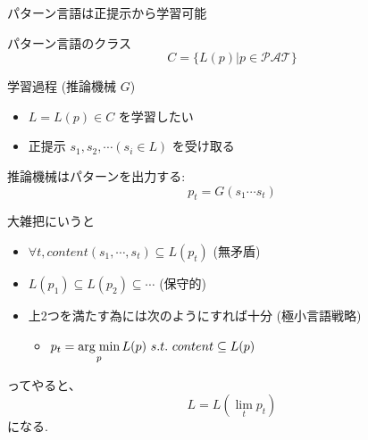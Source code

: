 \documentclass[professionalfont, 12pt, dvipdfmx, default, cjk]{beamer}
\begin{document}
\begin{frame}{パターン言語は正提示から学習可能}

パターン言語のクラス \[C = \{ L(p) | p \in \mathcal{PAT} \}\]

\end{frame}

\begin{frame}{学習過程 (推論機械 \(G\))}

\begin{itemize}
\itemsep1pt\parskip0pt
\item
  \(L = L(p) \in C\) を学習したい
\item
  正提示 \(s_1, s_2, \cdots (s_i \in L)\) を受け取る
\end{itemize}

推論機械はパターンを出力する: \[p_t = G(s_1 \cdots s_t)\]

\pause
大雑把にいうと

\begin{itemize}
\itemsep1pt\parskip0pt
\item
  \(\forall t, content(s_1, \cdots, s_t) \subseteq L(p_t)\) (無矛盾)
\item
  \(L(p_1) \subseteq L(p_2) \subseteq \cdots\) (保守的)
\item
  上2つを満たす為には次のようにすれば十分 (極小言語戦略)

  \begin{itemize}
  \itemsep1pt\parskip0pt
  \item
    \(p_t = \mathop{\rm arg\;min}\limits_p L(p) ~s.t.~ content \subseteq L(p)\)
  \end{itemize}
\end{itemize}

ってやると、 \[L = L(\lim_t p_t)\] になる.

\end{frame}
\end{document}
